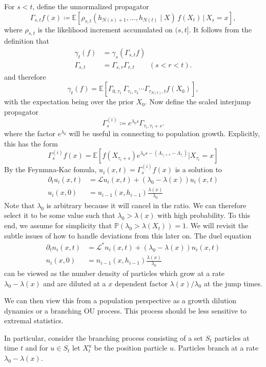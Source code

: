 \documentclass[11pt]{article}
\begin{document}
For $s<t$, define the unnormalized propagator
\begin{equation}
\Gamma_{s,t} f(x)
\coloneqq
\mathbb E\!\left[
\rho_{s,t}(h_{N(s)+1},\dots,h_{N(t)}\mid X)\,f(X_t) \,\big|\, X_s = x
\right],
\end{equation}
where $\rho_{s,t}$ is the likelihood increment accumulated on $(s,t]$. It follows from the definition that 
\begin{align}
\gamma_t(f)
&= \gamma_s\!\left(\Gamma_{s,t}f\right)\\
\Gamma_{s,t}&= \Gamma_{s,r} \Gamma_{r,t} \qquad (s<r<t).
\end{align}
and therefore 
\begin{equation}
\gamma_t(f)
=
{\mathbb E}[\Gamma_{0,\tau_1}\,
\Gamma_{\tau_1,\tau_2}
\cdots
\Gamma_{\tau_{N(t)},t}f(X_0)],
\end{equation}
with the expectation being over the prior $X_0$.
Now define the scaled interjump propagator
\begin{equation}  
\Gamma_s^{(i)} \coloneqq e^{\lambda_0 s}\Gamma_{\tau_i,\tau_i+ s}. 
\end{equation}
where the factor $e^{\lambda_0}$ will be useful in connecting to population growth. 
Explicitly, this has the form 
\begin{equation}
\Gamma_s^{(i)}f(x) = {\mathbb E}[f(X_{\tau_i + s})e^{\lambda_0 s-(\Lambda_{\tau_i + s}-\Lambda_{\tau_i})}|X_{\tau_i} = x]
\end{equation}
By the Feynmna-Kac fomula, $u_i(x,t) = \Gamma_s^{(i)}f(x)$ is a solution to 
\begin{align}
\partial_t u_i (x,t)&= {\mathcal L}u_i(x,t) + (\lambda_0 - \lambda(x))u_i(x,t)\\
u_i(x,0) &= u_{i-1}(x,h_{i-1})\frac{\lambda(x)}{\lambda_0}
\end{align}
Note that $\lambda_0$ is arbitrary because it will cancel in the ratio. We can therefore select it to be some value such that $\lambda_0 > \lambda(x)$ with high probability. To this end, we assume for simplicity that ${\mathbb P}(\lambda_0> \lambda(X_t))=1$. We will revisit the subtle issues of how to handle deviations from this later on. 
The duel equation 
\begin{align}
\partial_t n_i (x,t)&= {\mathcal L}^*n_i(x,t) + (\lambda_0 - \lambda(x))n_i(x,t)\\
n_i(x,0) &= n_{i-1}(x,h_{i-1})\frac{\lambda(x)}{\lambda_0}
\end{align}
can be viewed as the number density of particles which grow at a rate $\lambda_0 - \lambda(x)$ and are diluted at a $x$ dependent factor $\lambda(x)/\lambda_0$ at the jump times. 


We can then view this from a population perspective as a growth dilution dynamics or a branching OU process. This process should be less sensitive to extremal statistics. 

In particular, consider the branching process consisting of a set $S_t$ particles at time $t$ and for $u \in S_t$ let $X_t^u$ be the position particle $u$. Particles branch at a rate $\lambda_0-  \lambda(x)$. 
\end{document}
